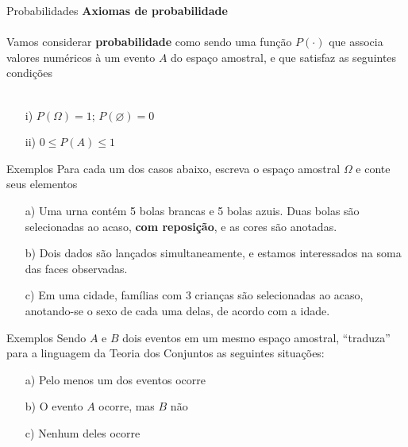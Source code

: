 \documentclass[10pt]{beamer}\usepackage[]{graphicx}\usepackage[]{color}
\theoremstyle{definition}
\begin{document}
\begin{frame}[fragile]{Probabilidades}
  \textbf{Axiomas de probabilidade}\\~\\
  Vamos considerar \textbf{probabilidade} como sendo uma função
  $P(\cdot)$ que associa valores numéricos à um evento $A$ do espaço
  amostral, e que satisfaz as seguintes condições \\~\\
  \begin{itemize}
  \item[i)] $P(\Omega) = 1$; $P(\varnothing) = 0$
  \item[ii)] $0 \leq P(A) \leq 1$ %
  \end{itemize}
\end{frame}

\begin{frame}[fragile]{Exemplos}
  Para cada um dos casos abaixo, escreva o espaço amostral $\Omega$ e
  conte seus elementos
  \begin{itemize}
  \item[a)] Uma urna contém 5 bolas brancas e 5 bolas azuis. Duas bolas
    são selecionadas ao acaso, \textbf{com reposição}, e as cores são
    anotadas.
  \item[b)] Dois dados são lançados simultaneamente, e estamos
    interessados na soma das faces observadas.
  \item[c)] Em uma cidade, famílias com 3 crianças são selecionadas ao
    acaso, anotando-se o sexo de cada uma delas, de acordo com a idade.
  \end{itemize}
\end{frame}

\begin{frame}[fragile]{Exemplos}
  Sendo $A$ e $B$ dois eventos em um mesmo espaço amostral, ``traduza''
  para a linguagem da Teoria dos Conjuntos as seguintes situações:
  \begin{itemize}
  \item[a)] Pelo menos um dos eventos ocorre
  \item[b)] O evento $A$ ocorre, mas $B$ não
  \item[c)] Nenhum deles ocorre
  \end{itemize}
\end{frame}
\end{document}
